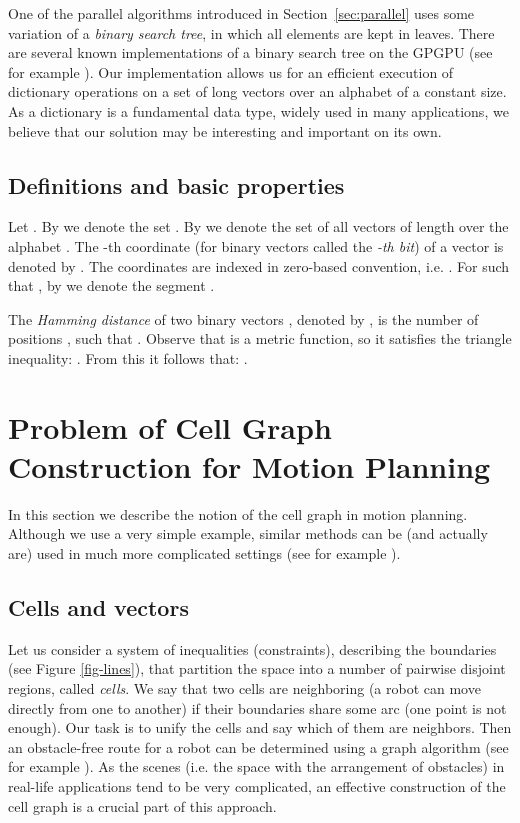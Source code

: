 \documentclass[a4paper]{article}
\begin{document}
One of the parallel algorithms introduced in Section~\ref{sec:parallel} uses some variation of a \textit{binary search tree}, in which all elements are kept in leaves. There are several known implementations of a binary search tree on the GPGPU (see for example \cite{Kim:2010:FFA:1807167.1807206}). 
Our implementation allows us for an efficient execution of dictionary operations on a set of long vectors over an alphabet of a constant size. 
As a dictionary is a fundamental data type, widely used in many applications, we believe that our solution may be interesting and important on its own.




\subsection{Definitions and basic properties}
Let . By  we denote the set . 
By  we denote the set of all vectors of length  over the alphabet . The -th coordinate (for binary vectors called the {\em -th bit}) of a vector  is denoted by . The coordinates are indexed in zero-based convention, i.e. . For  such that , by  we denote the segment . 

The {\em Hamming distance} of two binary vectors , denoted by , is the number of positions , such that . Observe that  is a metric function, so it satisfies the triangle inequality: .
From this it follows that: .


\section{Problem of Cell Graph Construction for Motion Planning} 
\label{sec:motivation}

In this section we describe the notion of the cell graph in motion planning. Although we use a very simple example, similar methods can be (and actually are) used in much more complicated settings (see for example \cite{Canny, Hwang}).

\subsection{Cells and vectors}

Let us consider a system of inequalities  (constraints), describing the boundaries (see Figure \ref{fig-lines}), that
partition the space into a number of pairwise disjoint regions, called {\em cells}. We say that two cells are neighboring (a robot can move directly from one to another) if their boundaries share some arc (one point is not enough). Our task is to unify the cells and say which of them are neighbors.
Then an obstacle-free route for a robot can be determined using a graph algorithm (see for example \cite{1664021}). As the scenes (i.e. the space with the arrangement of obstacles) in real-life applications tend to be very complicated, an effective construction of the cell graph is a crucial part of this approach.
\end{document}
